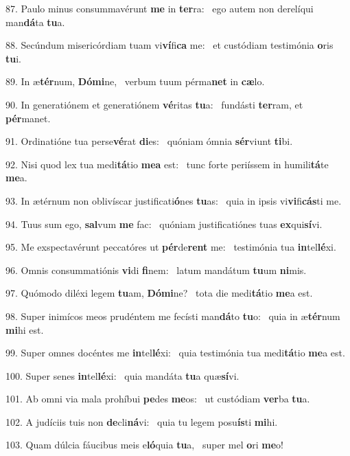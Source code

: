 87. Paulo minus consummavérunt \textbf{me} in \textbf{ter}ra: \ast\  ego autem non derelíqui man\textbf{dá}ta \textbf{tu}a.\

88. Secúndum misericórdiam tuam vi\textbf{ví}fi\textbf{ca} me: \ast\  et custódiam testimónia \textbf{o}ris \textbf{tu}i.\

89. In æ\textbf{tér}num, \textbf{Dó}\textbf{mi}ne, \ast\  verbum tuum pérma\textbf{net} in \textbf{cæ}lo.\

90. In generatiónem et generatiónem \textbf{vé}ritas \textbf{tu}a: \ast\  fundásti \textbf{ter}ram, et \textbf{pér}manet.\

91. Ordinatióne tua perse\textbf{vé}rat \textbf{di}es: \ast\  quóniam ómnia \textbf{sér}viunt \textbf{ti}bi.\

92. Nisi quod lex tua medi\textbf{tá}tio \textbf{me}\textbf{a} est: \ast\  tunc forte periíssem in humili\textbf{tá}te \textbf{me}a.\

93. In ætérnum non oblivíscar justificati\textbf{ó}nes \textbf{tu}as: \ast\  quia in ipsis vi\textbf{vi}fi\textbf{cás}ti me.\

94. Tuus sum ego, \textbf{sal}vum \textbf{me} fac: \ast\  quóniam justificatiónes tuas \textbf{ex}qui\textbf{sí}vi.\

95. Me exspectavérunt peccatóres ut \textbf{pér}de\textbf{rent} me: \ast\  testimónia tua \textbf{in}tel\textbf{lé}xi.\

96. Omnis consummatiónis \textbf{vi}di \textbf{fi}nem: \ast\  latum mandátum \textbf{tu}um \textbf{ni}mis.\

97. Quómodo diléxi legem \textbf{tu}am, \textbf{Dó}\textbf{mi}ne? \ast\  tota die medi\textbf{tá}tio \textbf{me}a est.\

98. Super inimícos meos prudéntem me fecísti man\textbf{dá}to \textbf{tu}o: \ast\  quia in æ\textbf{tér}num \textbf{mi}hi est.\

99. Super omnes docéntes me \textbf{in}tel\textbf{lé}xi: \ast\  quia testimónia tua medi\textbf{tá}tio \textbf{me}a est.\

100. Super senes \textbf{in}tel\textbf{lé}xi: \ast\  quia mandáta \textbf{tu}a quæ\textbf{sí}vi.\

101. Ab omni via mala prohíbui \textbf{pe}des \textbf{me}os: \ast\  ut custódiam \textbf{ver}ba \textbf{tu}a.\

102. A judíciis tuis non \textbf{de}cli\textbf{ná}vi: \ast\  quia tu legem posu\textbf{ís}ti \textbf{mi}hi.\

103. Quam dúlcia fáucibus meis e\textbf{ló}quia \textbf{tu}a, \ast\  super mel \textbf{o}ri \textbf{me}o!\

